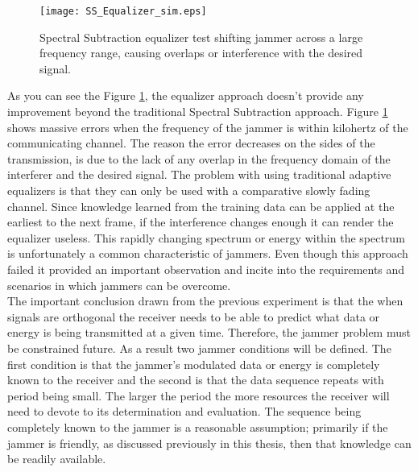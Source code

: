 \begin{figure}[!ht]\label{SS_equalizer}
\centering
\texttt{[image: SS\_Equalizer\_sim.eps]}
\caption{Spectral Subtraction equalizer test shifting jammer across a large frequency range, causing overlaps or interference with the desired signal.}
\end{figure} 

As you can see the Figure \ref{SS_equalizer}, the equalizer approach doesn't provide any improvement beyond the traditional Spectral Subtraction approach.  Figure \ref{SS_equalizer} shows massive errors when the frequency of the jammer is within kilohertz of the communicating channel.  The reason the error decreases on the sides of the transmission, is due to the lack of any overlap in the frequency domain of the interferer and the desired signal.  The problem with using traditional adaptive equalizers is that they can only be used with a comparative slowly fading channel.  Since knowledge learned from the training data can be applied at the earliest to the next frame, if the interference changes enough it can render the equalizer useless.  This rapidly changing spectrum or energy within the spectrum is unfortunately a common characteristic of jammers.  Even though this approach failed it provided an important observation and incite into the requirements and scenarios in which jammers can be overcome.\\ %



The important conclusion drawn from the previous experiment is that the when signals are orthogonal the receiver needs to be able to predict what data or energy is being transmitted at a given time.  Therefore, the jammer problem must be constrained future.  As a result two jammer conditions will be defined.  The first condition is that the jammer's modulated data or energy is completely known to the receiver and the second is that the data sequence repeats with period being small.  The larger the period the more resources the receiver will need to devote to its determination and evaluation.  The sequence being completely known to the jammer is a reasonable assumption; primarily if the jammer is friendly, as discussed previously in this thesis, then that knowledge can be readily available.\\

